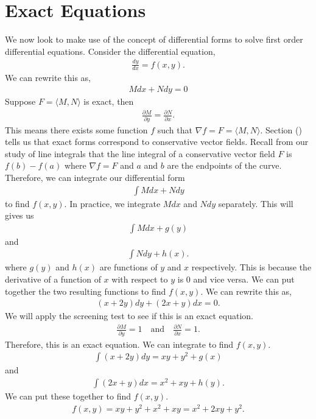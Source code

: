 \section{Exact Equations}
We now look to make use of the concept of differential forms to solve first order differential equations.
Consider the differential equation,
\begin{align*}
    \frac{dy}{dx} = f(x,y).
\end{align*}
We can rewrite this as,
\begin{align*}
    Mdx + Ndy = 0
\end{align*}
Suppose $F = \langle M, N \rangle $ is exact, then
\begin{align*}
    \frac{\partial M}{\partial y} = \frac{\partial N}{\partial x}.
\end{align*}
This means there exists some function $f$ such that $\nabla f = F = \langle M, N \rangle$.
Section () tells us that exact forms correspond to conservative vector fields.
Recall from our study of line integrals that the line integral of a conservative vector field $F$ is $f(b) - f(a)$ where $\nabla f = F$ and $a$ and $b$ are the endpoints of the curve.
Therefore, we can integrate our differential form 
\begin{align*}
    \int Mdx + Ndy 
\end{align*}
to find $f(x,y)$.
In practice, we integrate $Mdx$ and $Ndy$ separately.
This will gives us 
\begin{align*}
    \int Mdx + g(y)
\end{align*}
and
\begin{align*}
    \int Ndy + h(x).
\end{align*}
where $g(y)$ and $h(x)$ are functions of $y$ and $x$ respectively.
This is because the derivative of a function of $x$ with respect to $y$ is $0$ and vice versa.
We can put together the two resulting functions to find $f(x,y)$.
\newline
\example{\[\frac{dy}{dx} = - \frac{2x+y}{x+2y}\]}
\noindent We can rewrite this as,
\begin{align*}
    (x+2y)dy + (2x+y)dx = 0.
\end{align*}
We will apply the screening test to see if this is an exact equation.
\begin{align*}
    \frac{\partial M}{\partial y} = 1 \quad \text{and} \quad \frac{\partial N}{\partial x} = 1.
\end{align*}
Therefore, this is an exact equation.
We can integrate to find $f(x,y)$.
\begin{align*}
    \int (x+2y)dy = xy + y^2 + g(x)
\end{align*}
and
\begin{align*}
    \int (2x+y)dx = x^2 + xy + h(y).
\end{align*}
We can put these together to find $f(x,y)$.
\begin{align*}
    f(x,y) = xy + y^2 + x^2 + xy = x^2 + 2xy + y^2.
\end{align*}
